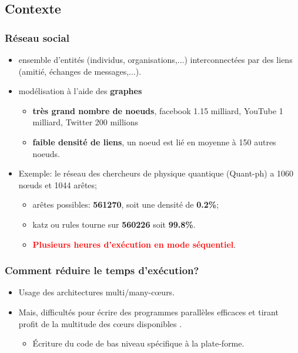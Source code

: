 \documentclass[10pt]{beamer}
\begin{document}
\subsection{Contexte}
\begin{frame}
\frametitle{Réseau social}
 \begin{itemize}
 \item ensemble d'entités (individus, organisations,...) interconnectées par des liens (amitié, échanges de messages,...).
 \item modélisation à l'aide des \textbf{graphes}
	\begin{itemize}
	 \item \textbf{très grand nombre de noeuds}, facebook 1.15 milliard, YouTube 1 milliard, Twitter 200 millions
	 \item \textbf{faible densité de liens}, un noeud est lié en moyenne à 150 autres noeuds.
	\end{itemize}
 \item Exemple: le réseau des chercheurs de physique quantique (Quant-ph) \cite{quant-ph} a 1060 n\oe uds et 1044 arêtes;
	\begin{itemize}
	 \item arêtes possibles: \textbf{561270}, soit une densité de \textbf{0.2\%};
	 \item katz \cite{articlekatz} ou rules  \cite{vanessaMasterThesis} tourne sur \textbf{560226} soit \textbf{99.8\%}.
	 \item \textbf{\textcolor{red}{Plusieurs heures d'exécution en mode séquentiel}}.
	\end{itemize}
\end{itemize}
\end{frame}

\begin{frame}
\frametitle{Comment réduire le temps d'exécution?}
\begin{itemize}
 \item Usage des architectures multi/many-c\oe urs.
 \item Mais, difficultés pour écrire des programmes parallèles efficaces et tirant profit de la multitude des c\oe urs disponibles \cite{articlemppa,articlemppacri}.
 \begin{itemize}
  \item Écriture du code de bas niveau spécifique à la plate-forme.
 \end{itemize}
\end{itemize}
\end{frame}
\end{document}
